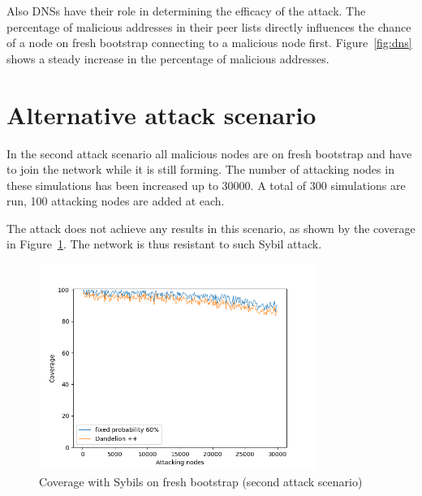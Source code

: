 Also DNSs have their role in determining the efficacy of the attack. The percentage of malicious addresses in their peer lists directly influences the chance of a node on fresh bootstrap connecting to a malicious node first. Figure~\ref{fig:dns} shows a steady increase in the percentage of malicious addresses.

\section{Alternative attack scenario}\label{sec:external}
In the second attack scenario all malicious nodes are on fresh bootstrap and have to join the network while it is still forming. The number of attacking nodes in these simulations has been increased up to 30000. A total of 300 simulations are run, 100 attacking nodes are added at each.\par

The attack does not achieve any results in this scenario, as shown by the coverage in Figure~\ref{fig:ext-cov}. The network is thus resistant to such Sybil attack.\par

\begin{figure}[h!]
            \includegraphics[width=0.8\textwidth]{pict/results/ext-cov.png}
			\centering
			\caption{Coverage with Sybils on fresh bootstrap (second attack scenario)}
			\label{fig:ext-cov}
\end{figure}

